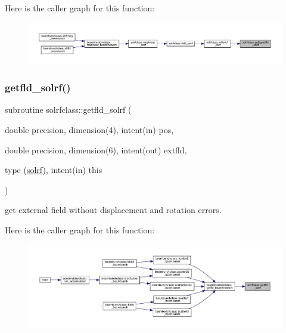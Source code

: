 Here is the caller graph for this function\+:\nopagebreak
\begin{figure}[H]
\begin{center}
\leavevmode
\includegraphics[width=350pt]{namespacesolrfclass_adf7673f885573c8468f07faebc432d7d_icgraph}
\end{center}
\end{figure}
\mbox{\label{namespacesolrfclass_a394f9bb9d3b50c8652a704f3c5af16ef}} 
\subsubsection{\texorpdfstring{getfld\_solrf()}{getfld\_solrf()}}
{\footnotesize\ttfamily subroutine solrfclass\+::getfld\+\_\+solrf (\begin{DoxyParamCaption}\item[{double precision, dimension(4), intent(in)}]{pos,  }\item[{double precision, dimension(6), intent(out)}]{extfld,  }\item[{type (\mbox{\hyperlink{namespacesolrfclass_structsolrfclass_1_1solrf}{solrf}}), intent(in)}]{this }\end{DoxyParamCaption})}



get external field without displacement and rotation errors. 

Here is the caller graph for this function\+:\nopagebreak
\begin{figure}[H]
\begin{center}
\leavevmode
\includegraphics[width=350pt]{namespacesolrfclass_a394f9bb9d3b50c8652a704f3c5af16ef_icgraph}
\end{center}
\end{figure}
\mbox{\label{namespacesolrfclass_a8a44826fce541cba8b4f7f5573ec7c98}} 
